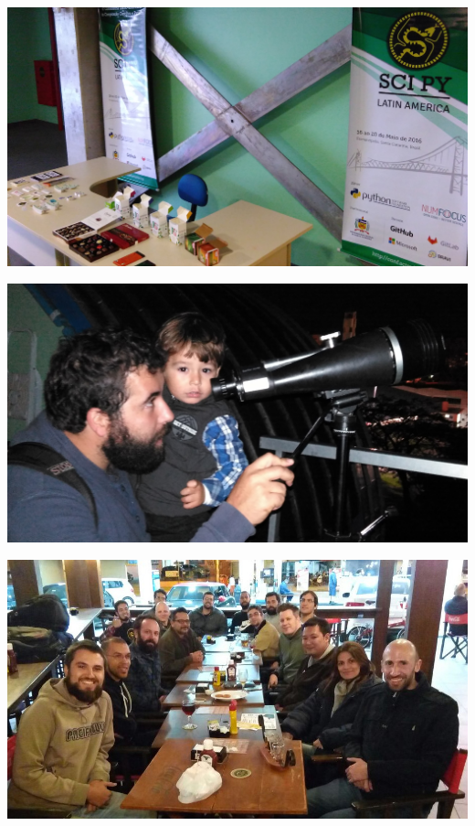 \documentclass[12pt]{article}
\begin{document}
\noindent  %
\includegraphics[width=\textwidth]{social-break.jpg}

\noindent  %
\includegraphics[width=\textwidth]{social-family.jpg}

\noindent  %
\includegraphics[width=\textwidth]{social-viking.jpg}
\end{document}
